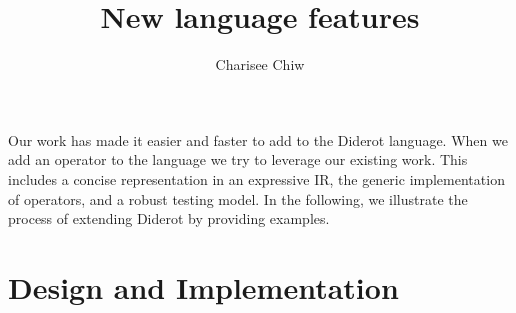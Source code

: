 \documentclass{article}
\title{New language features}
\author{Charisee Chiw}
\begin{document}
\maketitle 
Our work has made it easier and faster to add to the Diderot language.
When we add an operator to the language we try to leverage our existing work.
This includes a concise representation in an expressive IR, the generic implementation of operators, and a robust testing model.
In the following, we illustrate the process of extending Diderot by providing examples.

\section{Design and Implementation}











 
\end{document}
